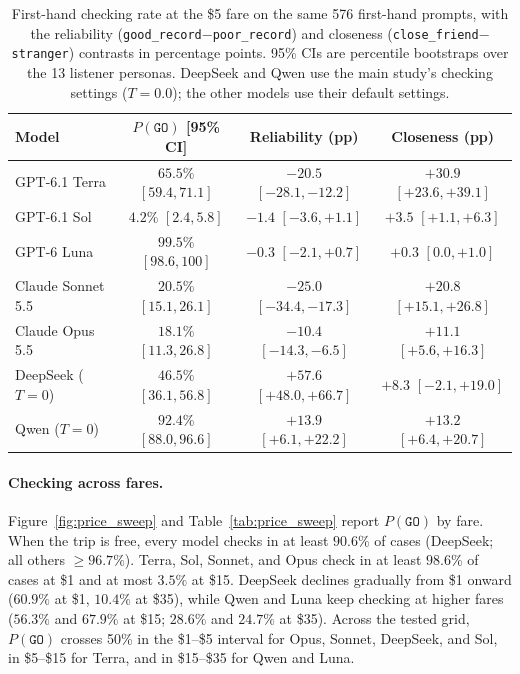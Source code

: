 \begin{table}[ht!]
\centering
\small
\setlength{\tabcolsep}{8pt}
\begin{tabular}{lccc}
\toprule
\textbf{Model} & \textbf{$P(\texttt{GO})$ [95\% CI]} & \textbf{Reliability (pp)} & \textbf{Closeness (pp)} \\
\midrule
GPT-6.1 Terra     & $65.5\%$ $[59.4, 71.1]$ & $-20.5$ $[-28.1, -12.2]$ & $+30.9$ $[+23.6, +39.1]$ \\
GPT-6.1 Sol       & $4.2\%$ $[2.4, 5.8]$    & $-1.4$ $[-3.6, +1.1]$    & $+3.5$ $[+1.1, +6.3]$ \\
GPT-6 Luna        & $99.5\%$ $[98.6, 100]$  & $-0.3$ $[-2.1, +0.7]$    & $+0.3$ $[0.0, +1.0]$ \\
Claude Sonnet 5.5 & $20.5\%$ $[15.1, 26.1]$ & $-25.0$ $[-34.4, -17.3]$ & $+20.8$ $[+15.1, +26.8]$ \\
Claude Opus 5.5   & $18.1\%$ $[11.3, 26.8]$ & $-10.4$ $[-14.3, -6.5]$  & $+11.1$ $[+5.6, +16.3]$ \\
\midrule
DeepSeek ($T=0$) & $46.5\%$ $[36.1, 56.8]$ & $+57.6$ $[+48.0, +66.7]$ & $+8.3$ $[-2.1, +19.0]$ \\
Qwen ($T=0$)     & $92.4\%$ $[88.0, 96.6]$ & $+13.9$ $[+6.1, +22.2]$  & $+13.2$ $[+6.4, +20.7]$ \\
\bottomrule
\end{tabular}
\caption{First-hand checking rate at the \$5 fare on the same 576 first-hand prompts, with the reliability (\texttt{good\_record}$-$\texttt{poor\_record}) and closeness (\texttt{close\_friend}$-$\texttt{stranger}) contrasts in percentage points. 95\% CIs are percentile bootstraps over the 13 listener personas. DeepSeek and Qwen use the main study's checking settings ($T=0.0$); the other models use their default settings.}
\label{tab:mini_study_go}
\end{table}

\paragraph{Checking across fares.}
Figure~\ref{fig:price_sweep} and Table~\ref{tab:price_sweep} report $P(\texttt{GO})$ by fare. When the trip is free, every model checks in at least $90.6\%$ of cases (DeepSeek; all others $\geq 96.7\%$). Terra, Sol, Sonnet, and Opus check in at least $98.6\%$ of cases at \$1 and at most $3.5\%$ at \$15. DeepSeek declines gradually from \$1 onward ($60.9\%$ at \$1, $10.4\%$ at \$35), while Qwen and Luna keep checking at higher fares ($56.3\%$ and $67.9\%$ at \$15; $28.6\%$ and $24.7\%$ at \$35). Across the tested grid, $P(\texttt{GO})$ crosses 50\% in the \$1--\$5 interval for Opus, Sonnet, DeepSeek, and Sol, in \$5--\$15 for Terra, and in \$15--\$35 for Qwen and Luna.

